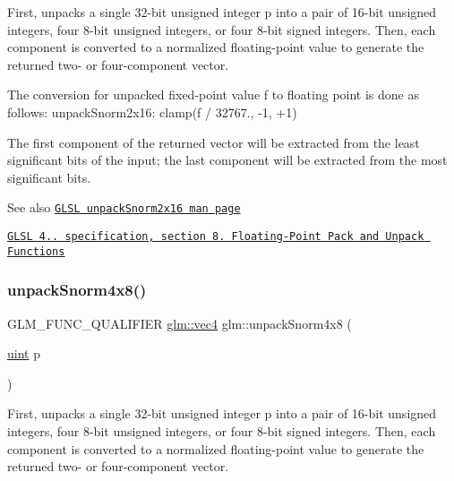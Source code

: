 First, unpacks a single 32-\/bit unsigned integer p into a pair of 16-\/bit unsigned integers, four 8-\/bit unsigned integers, or four 8-\/bit signed integers. Then, each component is converted to a normalized floating-\/point value to generate the returned two-\/ or four-\/component vector.

The conversion for unpacked fixed-\/point value f to floating point is done as follows\+: unpack\+Snorm2x16\+: clamp(f / 32767., -\/1, +1)

The first component of the returned vector will be extracted from the least significant bits of the input; the last component will be extracted from the most significant bits.

\begin{DoxySeeAlso}{See also}
\href{http://www.opengl.org/sdk/docs/manglsl/xhtml/unpackSnorm2x16.xml}{\tt G\+L\+SL unpack\+Snorm2x16 man page} 

\href{http://www.opengl.org/registry/doc/GLSLangSpec.4.20.8.pdf}{\tt G\+L\+SL 4.. specification, section 8. Floating-\/\+Point Pack and Unpack Functions} 
\end{DoxySeeAlso}
\mbox{\label{group__core__func__packing_ga4b18a0480e7260401d97f40cacd6bc36}} 
\subsubsection{\texorpdfstring{unpack\+Snorm4x8()}{unpackSnorm4x8()}}
{\footnotesize\ttfamily G\+L\+M\+\_\+\+F\+U\+N\+C\+\_\+\+Q\+U\+A\+L\+I\+F\+I\+ER \hyperlink{group__core__types_ga5881b1b022d7fd1b7218f5916532dd02}{glm\+::vec4} glm\+::unpack\+Snorm4x8 (\begin{DoxyParamCaption}\item[{\hyperlink{group__core__precision_ga4fd29415871152bfb5abd588334147c8}{uint}}]{p }\end{DoxyParamCaption})}

First, unpacks a single 32-\/bit unsigned integer p into a pair of 16-\/bit unsigned integers, four 8-\/bit unsigned integers, or four 8-\/bit signed integers. Then, each component is converted to a normalized floating-\/point value to generate the returned two-\/ or four-\/component vector.

